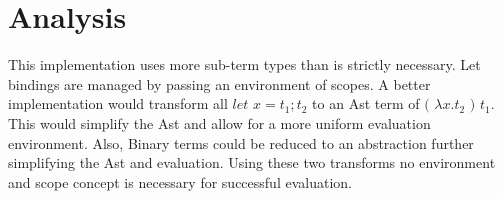 \documentclass{article}
\begin{document}
\section{Analysis}
This implementation uses more sub-term types than is strictly necessary. Let 
bindings are managed by passing an environment of scopes. A better 
implementation would transform all $let$ $x = t_1 ; t_2$ to an Ast term of 
$($ $\lambda x.t_2$ $)$ $t_1$. This would simplify the Ast and allow for a more
uniform evaluation environment. Also, Binary terms could be reduced to an
abstraction further simplifying the Ast and evaluation. Using these two 
transforms no environment and scope concept is necessary for successful 
evaluation.
\end{document}
